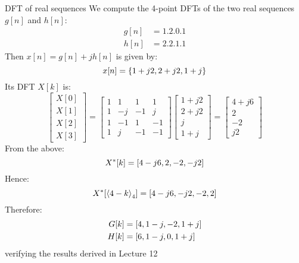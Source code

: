 \documentclass[../../main/main.tex]{subfiles}
\begin{document}
\begin{example}{DFT of real sequences}{}
    We compute the 4-point DFTs of the two real sequences \( g[n] \) and \( h[n] \):
    \begin{align}
        g[n] &= \qty{1,2,0,1}   \\
        h[n] &= \qty{2,2,1,1}
    \end{align}
    Then \( x[n] = g[n] + jh[n] \) is given by:
    \begin{equation}
        x[n]
        =
        \qty{1+j2, 2+j2, 1+j}
        \label{eq:L13_S06_3}
    \end{equation}
    Its DFT \( X[k] \) is:
    \begin{equation}
        \begin{bmatrix}
            X[0]    \\
            X[1]    \\
            X[2]    \\
            X[3]
        \end{bmatrix}
        =
        \begin{bmatrix}
            1   &   1   &   1   &   1   \\
            1   &   -j  &   -1  &   j   \\
            1   &   -1  &   1   &   -1  \\
            1   &   j   &   -1  &   -1
        \end{bmatrix}
        \begin{bmatrix}
            1 + j2  \\
            2 + j2  \\
            j       \\
            1 + j
        \end{bmatrix}
        =
        \begin{bmatrix}
            4 + j6  \\
            2       \\
            -2      \\
            j2
        \end{bmatrix}
        \label{eq:L13_S07_1}
    \end{equation}
    From the above:
    \begin{equation}
        X^{*}[k]
        =
        \qty[4-j6, 2, -2, -j2]
        \label{eq:L13_S07_2}
    \end{equation}
    Hence:
    \begin{equation}
        X^{*}[\expval{4-k}_{4}]
        =
        \qty[4-j6, -j2, -2, 2]
        \label{eq:L13_S07_3}
    \end{equation}
    Therefore:
    \begin{align}
        G[k] &= \qty[4,1-j,-2,1+j]  \\
        H[k] &= \qty[6,1-j, 0,1+j]
    \end{align}
    verifying the results derived in Lecture 12
\end{example}
\end{document}
